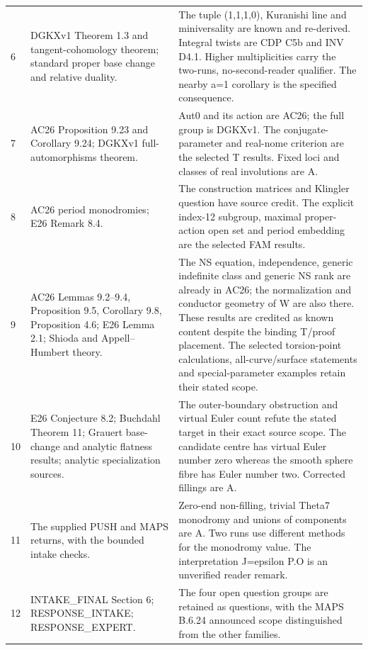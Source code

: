 \begin{longtable}{@{}L{.05\linewidth}L{.34\linewidth}L{.56\linewidth}@{}}
6 & DGKXv1 Theorem 1.3 and tangent-cohomology theorem; standard proper base change and relative duality. & The tuple (1,1,1,0), Kuranishi line and miniversality are known and re-derived. Integral twists are CDP C5b and INV D4.1. Higher multiplicities carry the two-runs, no-second-reader qualifier. The nearby a=1 corollary is the specified consequence.\\
7 & AC26 Proposition 9.23 and Corollary 9.24; DGKXv1 full-automorphisms theorem. & Aut0 and its action are AC26; the full group is DGKXv1. The conjugate-parameter and real-nome criterion are the selected T results. Fixed loci and classes of real involutions are A.\\
8 & AC26 period monodromies; E26 Remark 8.4. & The construction matrices and Klingler question have source credit. The explicit index-12 subgroup, maximal proper-action open set and period embedding are the selected FAM results.\\
9 & AC26 Lemmas 9.2--9.4, Proposition 9.5, Corollary 9.8, Proposition 4.6; E26 Lemma 2.1; Shioda and Appell--Humbert theory. & The NS equation, independence, generic indefinite class and generic NS rank are already in AC26; the normalization and conductor geometry of W are also there. These results are credited as known content despite the binding T/\allowbreak{}proof placement. The selected torsion-point calculations, all-curve/\allowbreak{}surface statements and special-parameter examples retain their stated scope.\\
10 & E26 Conjecture 8.2; Buchdahl Theorem 11; Grauert base-change and analytic flatness results; analytic specialization sources. & The outer-boundary obstruction and virtual Euler count refute the stated target in their exact source scope. The candidate centre has virtual Euler number zero whereas the smooth sphere fibre has Euler number two. Corrected fillings are A.\\
11 & The supplied PUSH and MAPS returns, with the bounded intake checks. & Zero-end non-filling, trivial Theta7 monodromy and unions of components are A. Two runs use different methods for the monodromy value. The interpretation J=epsilon P.O is an unverified reader remark.\\
12 & INTAKE\_\allowbreak{}FINAL Section 6; RESPONSE\_\allowbreak{}INTAKE; RESPONSE\_\allowbreak{}EXPERT. & The four open question groups are retained as questions, with the MAPS B.6.24 announced scope distinguished from the other families.\\
\bottomrule\end{longtable}\endgroup
